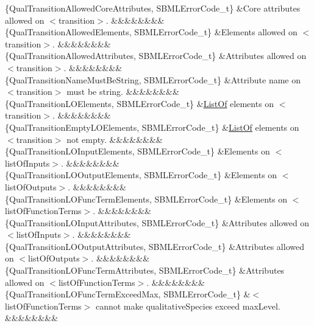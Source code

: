 \begin{DoxyParagraph}{}
\begin{longtabu}
\{Qual\+Transition\+Allowed\+Core\+Attributes, S\+B\+M\+L\+Error\+Code\+\_\+t\} &Core attributes allowed on {\ttfamily $<$transition$>$}. &&&&&&&&\\
\{Qual\+Transition\+Allowed\+Elements, S\+B\+M\+L\+Error\+Code\+\_\+t\} &Elements allowed on {\ttfamily $<$transition$>$}. &&&&&&&&\\
\{Qual\+Transition\+Allowed\+Attributes, S\+B\+M\+L\+Error\+Code\+\_\+t\} &Attributes allowed on {\ttfamily $<$transition$>$}. &&&&&&&&\\
\{Qual\+Transition\+Name\+Must\+Be\+String, S\+B\+M\+L\+Error\+Code\+\_\+t\} &Attribute \textquotesingle{}name\textquotesingle{} on {\ttfamily $<$transition$>$} must be string. &&&&&&&&\\
\{Qual\+Transition\+L\+O\+Elements, S\+B\+M\+L\+Error\+Code\+\_\+t\} &\hyperlink{class_list_of}{List\+Of} elements on {\ttfamily $<$transition$>$}. &&&&&&&&\\
\{Qual\+Transition\+Empty\+L\+O\+Elements, S\+B\+M\+L\+Error\+Code\+\_\+t\} &\hyperlink{class_list_of}{List\+Of} elements on {\ttfamily $<$transition$>$} not empty. &&&&&&&&\\
\{Qual\+Transition\+L\+O\+Input\+Elements, S\+B\+M\+L\+Error\+Code\+\_\+t\} &Elements on {\ttfamily $<$list\+Of\+Inputs$>$}. &&&&&&&&\\
\{Qual\+Transition\+L\+O\+Output\+Elements, S\+B\+M\+L\+Error\+Code\+\_\+t\} &Elements on {\ttfamily $<$list\+Of\+Outputs$>$}. &&&&&&&&\\
\{Qual\+Transition\+L\+O\+Func\+Term\+Elements, S\+B\+M\+L\+Error\+Code\+\_\+t\} &Elements on {\ttfamily $<$list\+Of\+Function\+Terms$>$}. &&&&&&&&\\
\{Qual\+Transition\+L\+O\+Input\+Attributes, S\+B\+M\+L\+Error\+Code\+\_\+t\} &Attributes allowed on {\ttfamily $<$list\+Of\+Inputs$>$}. &&&&&&&&\\
\{Qual\+Transition\+L\+O\+Output\+Attributes, S\+B\+M\+L\+Error\+Code\+\_\+t\} &Attributes allowed on {\ttfamily $<$list\+Of\+Outputs$>$}. &&&&&&&&\\
\{Qual\+Transition\+L\+O\+Func\+Term\+Attributes, S\+B\+M\+L\+Error\+Code\+\_\+t\} &Attributes allowed on {\ttfamily $<$list\+Of\+Function\+Terms$>$}. &&&&&&&&\\
\{Qual\+Transition\+L\+O\+Func\+Term\+Exceed\+Max, S\+B\+M\+L\+Error\+Code\+\_\+t\} &{\ttfamily $<$list\+Of\+Function\+Terms$>$} cannot make qualitative\+Species exceed max\+Level. &&&&&&&&\\

\end{longtabu}
\end{DoxyParagraph}
